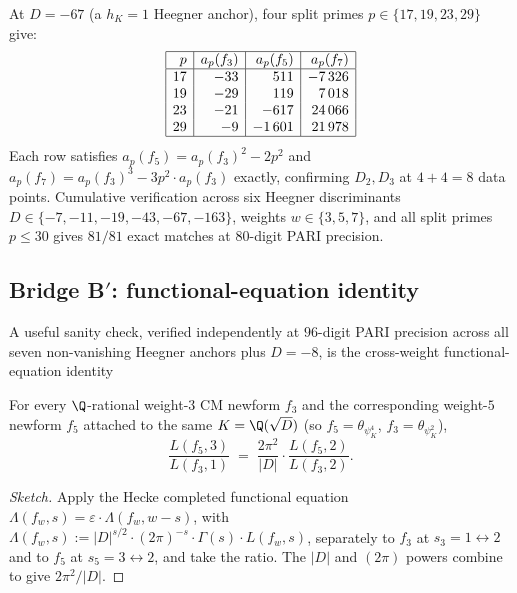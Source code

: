 \begin{remark}
At $D = -67$ (a $h_K = 1$ Heegner anchor), four split primes
$p \in \{17, 19, 23, 29\}$ give:
\[
\begin{array}{|r|r|r|r|}
\hline
p & a_p(f_3) & a_p(f_5) & a_p(f_7) \\
\hline
17 & -33 & 511 & -7\,326 \\
19 & -29 & 119 & 7\,018 \\
23 & -21 & -617 & 24\,066 \\
29 & -9 & -1\,601 & 21\,978 \\
\hline
\end{array}
\]
Each row satisfies $a_p(f_5) = a_p(f_3)^2 - 2p^2$ and
$a_p(f_7) = a_p(f_3)^3 - 3 p^2 \cdot a_p(f_3)$ exactly, confirming
$D_2, D_3$ at $4 + 4 = 8$ data points. Cumulative verification
across six Heegner discriminants $D \in \{-7, -11, -19, -43, -67,
-163\}$, weights $w \in \{3, 5, 7\}$, and all split primes
$p \leq 30$ gives $81/81$ exact matches at $80$-digit PARI
precision.
\end{remark}

\subsection{Bridge B$'$: functional-equation identity}
\label{ss:bridge-Bprime}

A useful sanity check, verified independently at $96$-digit PARI
precision across all seven non-vanishing Heegner anchors plus
$D = -8$, is the cross-weight functional-equation identity

\begin{proposition}\label{prop:bridge-Bprime}
For every $\Q$-rational weight-$3$ CM newform $f_3$ and the
corresponding weight-$5$ newform $f_5$ attached to the same
$K = \Q(\sqrt{D})$ (so $f_5 = \theta_{\psi_K^4}$, $f_3 = \theta_{\psi_K^2}$),
\begin{equation}\label{eq:bridge-Bprime}
\frac{L(f_5, 3)}{L(f_3, 1)} \;=\; \frac{2\pi^2}{|D|} \cdot
\frac{L(f_5, 2)}{L(f_3, 2)}.
\end{equation}
\end{proposition}

\begin{proof}[Sketch]
Apply the Hecke completed functional equation
$\Lambda(f_w, s) = \varepsilon \cdot \Lambda(f_w, w - s)$,
with $\Lambda(f_w, s) := |D|^{s/2} \cdot (2\pi)^{-s} \cdot
\Gamma(s) \cdot L(f_w, s)$, separately to $f_3$ at $s_3 = 1
\leftrightarrow 2$ and to $f_5$ at $s_5 = 3 \leftrightarrow 2$,
and take the ratio. The $|D|$ and $(2\pi)$ powers combine to
give $2\pi^2/|D|$.
\end{proof}

